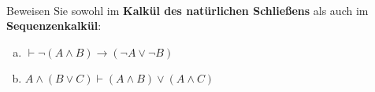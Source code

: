 \newcommand{\printpraesenzlsg}{false}
\newcommand{\printloesungen}{false}
\newcommand{\printbewertungen}{false}
\newcommand{\klausurdatum}{29. Januar 2026}
\newcommand{\klausurdauer}{90 Minuten}
\newcommand{\klausuraufgaben}{7}
\newcommand{\klausurpunkte}{45}

\usepackage{bussproofs}




\\
Beweisen Sie sowohl im \textbf{Kalkül des natürlichen Schließens} als auch im \textbf{Sequenzenkalkül}:
\begin{enumerate}[a)]
  \item $\vdash \neg(A \wedge B) \to (\neg A \vee \neg B)$
  \item $A \wedge (B \vee C) \vdash (A \wedge B) \vee (A \wedge C)$
\end{enumerate}

